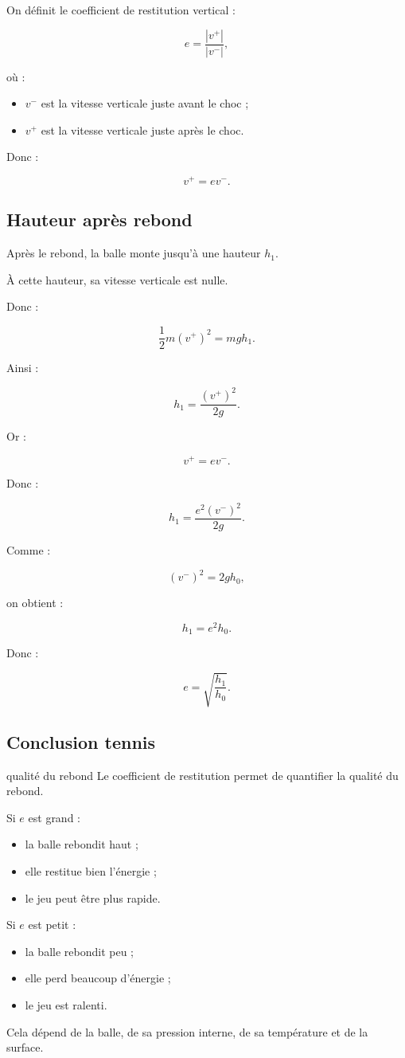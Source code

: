 \documentclass[11pt,a4paper]{article}
\begin{document}
On définit le coefficient de restitution vertical :

\[
e=\frac{|v^+|}{|v^-|},
\]

où :
\begin{itemize}
    \item $v^-$ est la vitesse verticale juste avant le choc ;
    \item $v^+$ est la vitesse verticale juste après le choc.
\end{itemize}

Donc :

\[
v^+=ev^-.
\]

\subsection{Hauteur après rebond}

Après le rebond, la balle monte jusqu'à une hauteur $h_1$.

À cette hauteur, sa vitesse verticale est nulle.

Donc :

\[
\frac12m(v^+)^2=mgh_1.
\]

Ainsi :

\[
h_1=\frac{(v^+)^2}{2g}.
\]

Or :

\[
v^+=ev^-.
\]

Donc :

\[
h_1=\frac{e^2(v^-)^2}{2g}.
\]

Comme :

\[
(v^-)^2=2gh_0,
\]

on obtient :

\[
h_1=e^2h_0.
\]

Donc :

\[
e=\sqrt{\frac{h_1}{h_0}}.
\]

\subsection{Conclusion tennis}

\begin{tennis}{qualité du rebond}
Le coefficient de restitution permet de quantifier la qualité du rebond.

Si $e$ est grand :
\begin{itemize}
    \item la balle rebondit haut ;
    \item elle restitue bien l'énergie ;
    \item le jeu peut être plus rapide.
\end{itemize}

Si $e$ est petit :
\begin{itemize}
    \item la balle rebondit peu ;
    \item elle perd beaucoup d'énergie ;
    \item le jeu est ralenti.
\end{itemize}

Cela dépend de la balle, de sa pression interne, de sa température et de la surface.
\end{tennis}
\end{document}
